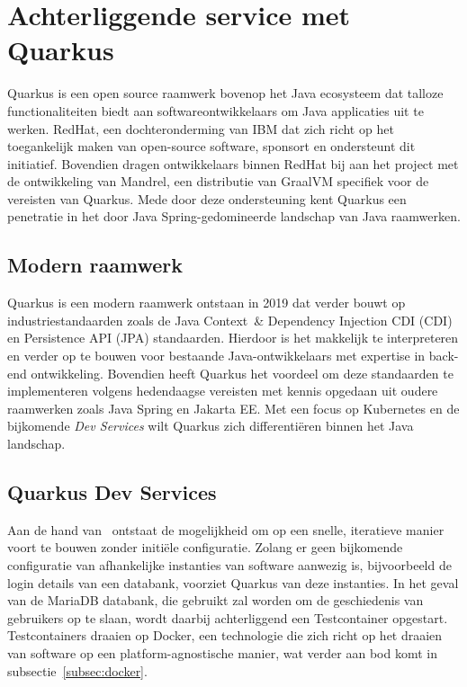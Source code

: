 \section{Achterliggende service met Quarkus}
\label{sec:keuze-framework-voor-back-end}
Quarkus is een open source raamwerk bovenop het Java ecosysteem dat talloze functionaliteiten biedt aan softwareontwikkelaars om Java applicaties uit te werken.
RedHat, een dochteronderming van IBM dat zich richt op het toegankelijk maken van open-source software, sponsort en ondersteunt dit initiatief.
Bovendien dragen ontwikkelaars binnen RedHat bij aan het project met de ontwikkeling van Mandrel, een distributie van GraalVM specifiek voor de vereisten van Quarkus.
Mede door deze ondersteuning kent Quarkus een penetratie in het door Java Spring-gedomineerde landschap van Java raamwerken.

\subsection{Modern raamwerk}
\label{subsec:modern-raamwerk}
Quarkus is een modern raamwerk ontstaan in 2019 dat verder bouwt op industriestandaarden zoals de Java Context~\& Dependency Injection CDI (CDI) en Persistence API (JPA) standaarden.
Hierdoor is het makkelijk te interpreteren en verder op te bouwen voor bestaande Java-ontwikkelaars met expertise in back-end ontwikkeling.
Bovendien heeft Quarkus het voordeel om deze standaarden te implementeren volgens hedendaagse vereisten met kennis opgedaan uit oudere raamwerken zoals Java Spring en Jakarta EE\@.
Met een focus op Kubernetes en de bijkomende \textit{Dev Services} wilt Quarkus zich differentiëren binnen het Java landschap.

\subsection{Quarkus Dev Services}
\label{subsec:quarkus-dev-services}
Aan de hand van~\autocite{Quarkus} ontstaat de mogelijkheid om op een snelle, iteratieve manier voort te bouwen zonder initiële configuratie.
Zolang er geen bijkomende configuratie van afhankelijke instanties van software aanwezig is, bijvoorbeeld de login details van een databank, voorziet Quarkus van deze instanties.
In het geval van de MariaDB databank, die gebruikt zal worden om de geschiedenis van gebruikers op te slaan, wordt daarbij achterliggend een Testcontainer opgestart.
Testcontainers draaien op Docker, een technologie die zich richt op het draaien van software op een platform-agnostische manier, wat verder aan bod komt in subsectie~\ref{subsec:docker}.

